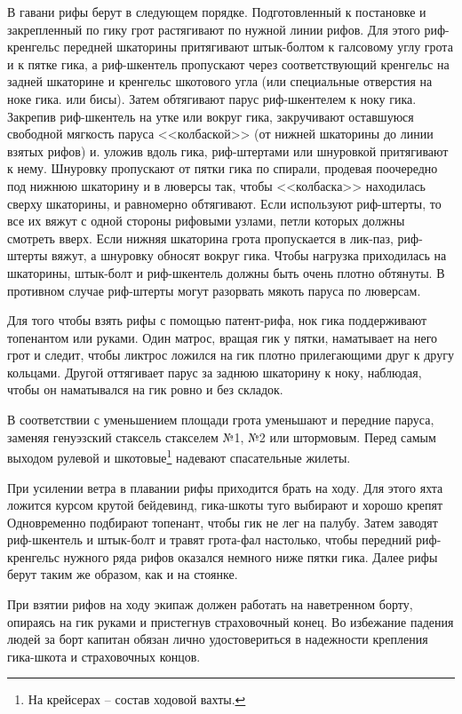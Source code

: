 \documentclass[a4paper, 12pt, twoside, final]{scrbook}
\begin{document}
В гавани рифы берут в следующем порядке. Подготовленный к постановке и закрепленный по гику грот растягивают по нужной линии рифов. Для этого риф-кренгельс передней шкаторины притягивают штык-болтом к галсовому углу грота и к пятке гика, а риф-шкентель пропускают через соответствующий кренгельс на задней шкаторине и кренгельс шкотового угла (или специальные отверстия на ноке гика. или бисы). Затем обтягивают парус риф-шкентелем к ноку гика. Закрепив риф-шкентель на утке или вокруг гика, закручивают оставшуюся свободной мягкость паруса <<колбаской>> (от нижней шкаторины до линии взятых рифов) и. уложив вдоль гика, риф-штертами или шнуровкой притягивают к нему. Шнуровку пропускают от пятки гика по спирали, продевая поочередно под нижнюю шкаторину и в люверсы так, чтобы <<колбаска>> находилась сверху шкаторины, и равномерно обтягивают. Если используют риф-штерты, то все их вяжут с одной стороны рифовыми узлами, петли которых должны смотреть вверх. Если нижняя шкаторина грота пропускается в лик-паз, риф-штерты вяжут, а шнуровку обносят вокруг гика. Чтобы нагрузка приходилась на шкаторины, штык-болт и риф-шкентель должны быть очень плотно обтянуты. В противном случае риф-штерты могут разорвать мякоть паруса по люверсам.

Для того чтобы взять рифы с помощью патент-рифа, нок гика поддерживают топенантом или руками. Один матрос, вращая гик у пятки, наматывает на него грот и следит, чтобы ликтрос ложился на гик плотно прилегающими друг к другу кольцами. Другой оттягивает парус за заднюю шкаторину к ноку, наблюдая, чтобы он наматывался на гик ровно и без складок.

В соответствии с уменьшением площади грота уменьшают и передние паруса, заменяя генуэзский стаксель стакселем №1, №2 или штормовым. Перед самым выходом рулевой и шкотовые\footnote{На крейсерах \--- состав ходовой вахты.} надевают спасательные жилеты.

При усилении ветра в плавании рифы приходится брать на ходу. Для этого яхта ложится курсом крутой бейдевинд, гика-шкоты туго выбирают и хорошо крепят Одновременно подбирают топенант, чтобы гик не лег на палубу. Затем заводят риф-шкентель и штык-болт и травят грота-фал настолько, чтобы передний риф-кренгельс нужного ряда рифов оказался немного ниже пятки гика. Далее рифы берут таким же образом, как и на стоянке.

При взятии рифов на ходу экипаж должен работать на наветренном борту, опираясь на гик руками и пристегнув страховочный конец. Во избежание падения людей за борт капитан обязан лично удостовериться в надежности крепления гика-шкота и страховочных концов.
\end{document}
